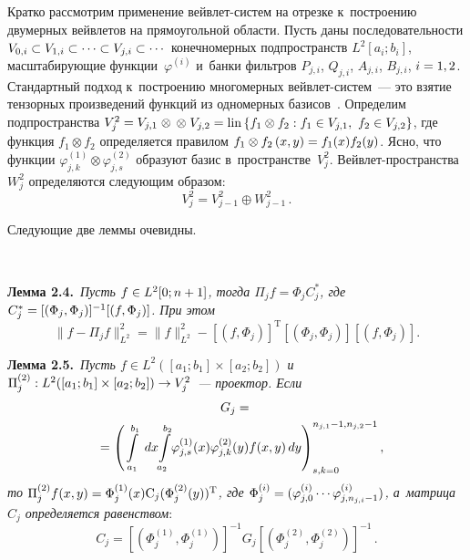 \begin{multicols}{2}
Кратко рассмотрим применение вейв\-лет-сис\-тем на отрезке к~построению 
двумерных вейвлетов на прямоугольной области. Пусть даны последовательности $V_{0,i} 
\hm\subset V_{1,i} \subset \cdots \subset V_{j,i} \subset \cdots$ 
конечномерных подпространств ${L}^{2} [a_{i} ;b_{i} ]$, 
масштаби\-ру\-ющие функции~$\varphi ^{(i)} $ и~банки фильтров 
${P}_{j,i}$, ${Q}_{j,i}$, ${A}_{j,i}$, ${B}_{j,i}$, 
$ i\hm=1,2$. Стандартный подход к~построению многомерных вейв\-лет-сис\-тем~--- 
это взятие тензорных произведений функций из одномерных базисов~\cite{Novikov}. 
Определим подпространства $V_{j}^{2} \hm=V_{j,1}\;\otimes$\linebreak
$\otimes\;V_{j,2} \hm= \mathrm{lin}
\left\{f_{1} \otimes f_{2} : f_{1} \hm\in V_{j,1},\ f_{2} \hm\in V_{j,2} \right\}$, 
где функция $f_{1} \otimes f_{2} $ определяется правилом 
$f_{1} \hm\otimes f_{2} \left(x,y\right)\hm=f_{1} (x)f_{2} (y)$. 
Ясно, что функции $\varphi _{j,k}^{(1)} \otimes \varphi _{j,s}^{(2)} $ 
образуют базис в~пространстве~$V_{j}^{2} $.  Вейв\-лет-про\-стран\-ст\-ва~$W_{j}^{2} $ 
определяются следующим образом: 
$$
V_{j}^{2} =V_{j-1}^{2} \oplus W_{j-1}^{2} \,.
$$

Следующие две леммы очевидны.

\begin{figure*}[b] %
\vspace*{1pt}
 \begin{center}
 \mbox{%
 \epsfxsize=162.046mm 
 }
 \end{center}
\vspace*{-9pt}
\end{figure*}


\noindent
\textbf{Лемма 2.4.}\ 
\textit{Пусть $f\hm\in {L}^{2}[0;n+1]$, тогда 
$\Pi _{j} f=\Phi _{j} {C}_{j}^{*} $, где
 ${C}_{j}^{*}\hm =[(\Phi _{j} ,\Phi _{j})]^{-1}[(f,\Phi _{j})]$. 
 При этом} 
 $$
 \| f-\Pi _{j} f\| _{{L}^{2} }^{2} =
 \| f\| _{{L}^{2} }^{2} -\left[(f,\Phi _{j})\right]^{\mathrm{T}}
 \left[(\Phi _{j} ,\Phi _{j})\right]\left[(f,\Phi _{j})\right].
 $$

\smallskip

\noindent
\textbf{Лемма 2.5.}\ 
\textit{Пусть $f\in {L}^2([a_1;b_1]\times [a_2;b_2])$ 
и~$\Pi_j^{(2)} : {L}^2([a_1;b_1]\times [a_2;b_2])\hm\to V_j^2$~--- 
проектор. Если}
\begin{multline*}
{G}_j={}\\
{}=\left(\int\limits_{\,\,\,a_1}^{b_1}\,dx\!
\int\limits_{a_2}^{b_2}\!\varphi_{j,s}^{(1)}(x)\varphi_{j,k}^{(2)}(y)f(x,y)\,dy
\right)_{s,k=0}^{n_{j,1}-1,n_{j,2}-1},\hspace*{-5.4785pt}
\end{multline*}
\textit{то $\Pi_j^{(2)}f (x,y)\hm=\Phi_j^{(1)}(x)\mathrm{C}_j (\Phi_j^{(2)}
(y))^{\mathrm{T}}$, где $\Phi_j^{(i)}\hm=(\varphi_{j,0}^{(i)}\cdots \varphi_{j,n_{j,i}-1}^{(i)})$, 
а~матрица~${C}_j$ определяется равенством}:
\begin{equation*}
{C}_j=\left[\left(\Phi_j^{(1)},\Phi_j^{(1)}\right)\right]^{-1}
{G}_j\left[\left(\Phi_j^{(2)},\Phi_j^{(2)}\right)\right]^{-1}\,.
\end{equation*}


\end{multicols}
